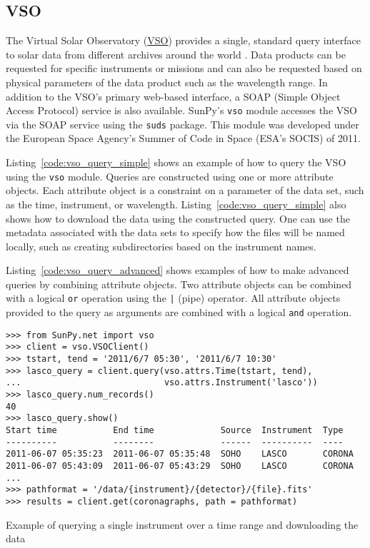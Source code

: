 \subsection{VSO}\label{ssec:vso}

The Virtual Solar Observatory (\href{http://virtualsolar.org}{VSO}) provides a 
single, standard query interface to solar data from different archives 
around the world \citep{hill2009}.
Data products can be requested for specific instruments or missions and
can also be requested based on physical parameters of the data product such
as the wavelength range.
In addition to the VSO's primary web-based interface, a SOAP (Simple Object 
Access Protocol) service is also available.
SunPy's \texttt{vso} module accesses the VSO via the SOAP service using the
\texttt{suds} package.
This module was developed under the European Space Agency's Summer of Code in 
Space (ESA's SOCIS) of 2011.

Listing~\ref{code:vso_query_simple} shows an example of how to query the VSO
using the \texttt{vso} module.
Queries are constructed using one or more attribute objects. Each
attribute object is a constraint on a parameter of the data set, such as the
time, instrument, or wavelength.
Listing~\ref{code:vso_query_simple} also shows how to download the data using
the constructed query. One can use the metadata associated with the data sets to 
specify how the files will be named locally, such as creating subdirectories 
based on the instrument names.

Listing~\ref{code:vso_query_advanced} shows examples of how to make advanced
queries by combining attribute objects.
Two attribute objects can be combined with a logical \texttt{or} operation
using the \texttt{|} (pipe) operator.
All attribute objects provided to the query as arguments are combined with a 
logical \texttt{and} operation.

\begin{listing}[H]
\begin{verbatim}
>>> from SunPy.net import vso
>>> client = vso.VSOClient()
>>> tstart, tend = '2011/6/7 05:30', '2011/6/7 10:30'
>>> lasco_query = client.query(vso.attrs.Time(tstart, tend),
...                            vso.attrs.Instrument('lasco'))
>>> lasco_query.num_records()
40
>>> lasco_query.show() 
Start time           End time             Source  Instrument  Type
----------           --------             ------  ----------  ----
2011-06-07 05:35:23  2011-06-07 05:35:48  SOHO    LASCO       CORONA
2011-06-07 05:43:09  2011-06-07 05:43:29  SOHO    LASCO       CORONA
...
>>> pathformat = '/data/{instrument}/{detector}/{file}.fits'
>>> results = client.get(coronagraphs, path = pathformat)
\end{verbatim}
\caption{Example of querying a single instrument over a time range and downloading the data}
\label{code:vso_query_simple}
\end{listing}

